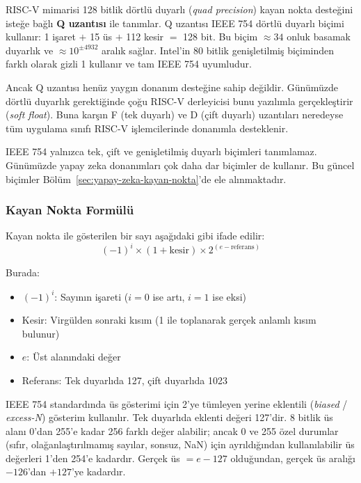 \begin{bilginot}
RISC-V mimarisi 128 bitlik dörtlü duyarlı (\emph{quad precision}) kayan nokta desteğini isteğe bağlı \textbf{Q uzantısı} ile tanımlar. Q uzantısı IEEE 754 dörtlü duyarlı biçimi kullanır: 1 işaret $+$ 15 üs $+$ 112 kesir $=$ 128 bit. Bu biçim $\approx 34$ onluk basamak duyarlık ve $\approx 10^{\pm 4932}$ aralık sağlar. Intel'in 80 bitlik genişletilmiş biçiminden farklı olarak gizli 1 kullanır ve tam IEEE 754 uyumludur.

Ancak Q uzantısı henüz yaygın donanım desteğine sahip değildir. Günümüzde dörtlü duyarlık gerektiğinde çoğu RISC-V derleyicisi bunu yazılımla gerçekleştirir (\emph{soft float}). Buna karşın F (tek duyarlı) ve D (çift duyarlı) uzantıları neredeyse tüm uygulama sınıfı RISC-V işlemcilerinde donanımla desteklenir.
\end{bilginot}

IEEE 754 yalnızca tek, çift ve genişletilmiş duyarlı biçimleri tanımlamaz. Günümüzde yapay zeka donanımları çok daha dar biçimler de kullanır. Bu güncel biçimler Bölüm~\ref{sec:yapay-zeka-kayan-nokta}'de ele alınmaktadır.

\subsubsection{Kayan Nokta Formülü}

Kayan nokta ile gösterilen bir sayı aşağıdaki gibi ifade edilir:
\begin{equation}
(-1)^i \times (1 + \text{kesir}) \times 2^{(e - \text{referans})}
\label{eq:kayan-nokta}
\end{equation}

Burada:
\begin{itemize}
\item $(-1)^i$: Sayının işareti ($i=0$ ise artı, $i=1$ ise eksi)
\item Kesir: Virgülden sonraki kısım (1 ile toplanarak gerçek anlamlı kısım bulunur)
\item $e$: Üst alanındaki değer
\item Referans: Tek duyarlıda 127, çift duyarlıda 1023
\end{itemize}

IEEE 754 standardında üs gösterimi için 2'ye tümleyen yerine eklentili (\emph{biased} / \emph{excess-N}) gösterim kullanılır. Tek duyarlıda eklenti değeri 127'dir. 8 bitlik üs alanı 0'dan 255'e kadar 256 farklı değer alabilir; ancak 0 ve 255 özel durumlar (sıfır, olağanlaştırılmamış sayılar, sonsuz, NaN) için ayrıldığından kullanılabilir üs değerleri 1'den 254'e kadardır. Gerçek üs $= e - 127$ olduğundan, gerçek üs aralığı $-126$'dan $+127$'ye kadardır.

